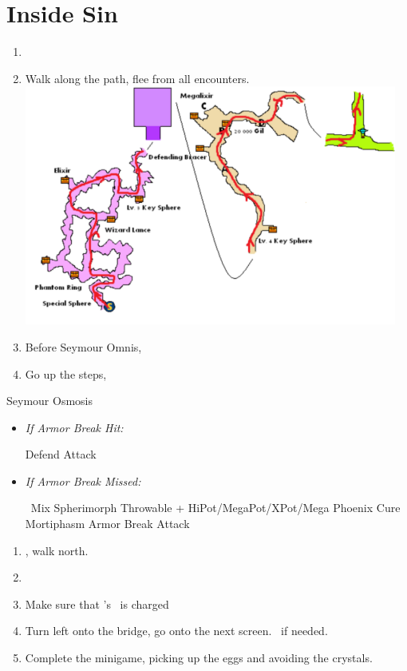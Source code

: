 \chapter{Inside Sin}
\begin{enumerate}
  \item \formation{\tidus}{\kimahri}{\auron}
  \item Walk along the path, flee from all encounters.
        \includegraphics{graphics/sinpath}
  \item Before Seymour Omnis, \formation{\tidus}{\yuna}{\auron}
  \item Go up the steps, \sd
\end{enumerate}
\begin{battle}[80000]{Seymour Osmosis}
  \begin{itemize}
    \yunaf Defend
    \tidusf Armor Break
    \item \textit{If Armor Break Hit:}
          \begin{itemize}
            \auronf Defend
            \summon{\bahamut}
            \bahamutf Attack
          \end{itemize}
    \item \textit{If Armor Break Missed:}
          \begin{itemize}
            \switch{\auronf}{\rikku}
            \rikkuf \od\ Mix Spherimorph Throwable + HiPot/MegaPot/XPot/Mega Phoenix
            \yunaf Cure Mortiphasm
            \tidusf Armor Break
            \summon{\bahamut}
            \bahamutf Attack
          \end{itemize}
  \end{itemize}
\end{battle}
\begin{enumerate}
  \item \sd, walk north.
  \item \formation{\tidus}{\kimahri}{\auron}
  \item Make sure that \rikku's \od\ is charged
  \item Turn left onto the bridge, go onto the next screen. \save\ if needed.
  \item Complete the minigame, picking up the eggs and avoiding the crystals.
\end{enumerate}
